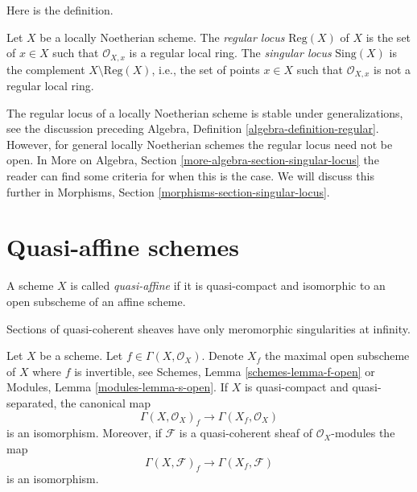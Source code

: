 \noindent
Here is the definition.

\begin{definition}
\label{definition-singular-locus}
Let $X$ be a locally Noetherian scheme. The {\it regular locus}
$\text{Reg}(X)$ of $X$ is the set of $x \in X$ such that $\mathcal{O}_{X, x}$
is a regular local ring. The {\it singular locus} $\text{Sing}(X)$ is the
complement $X \setminus \text{Reg}(X)$, i.e., the set of points $x \in X$
such that $\mathcal{O}_{X, x}$ is not a regular local ring.
\end{definition}

\noindent
The regular locus of a locally Noetherian scheme is stable under
generalizations, see the discussion preceding
Algebra, Definition \ref{algebra-definition-regular}.
However, for general locally Noetherian schemes the regular locus
need not be open. In
More on Algebra, Section \ref{more-algebra-section-singular-locus}
the reader can find some criteria for when this is the case.
We will discuss this further in
Morphisms, Section \ref{morphisms-section-singular-locus}.








\section{Quasi-affine schemes}
\label{section-quasi-affine}

\begin{definition}
\label{definition-quasi-affine}
A scheme $X$ is called {\it quasi-affine} if it is quasi-compact
and isomorphic to an open subscheme of an affine scheme.
\end{definition}

\begin{lemma}
\label{lemma-invert-f-sections}
\begin{slogan}
Sections of quasi-coherent sheaves have only meromorphic singularities
at infinity.
\end{slogan}
Let $X$ be a scheme. Let $f \in \Gamma(X, \mathcal{O}_X)$.
Denote $X_f$ the maximal open subscheme of $X$ where $f$ is invertible, see
Schemes, Lemma \ref{schemes-lemma-f-open} or
Modules, Lemma \ref{modules-lemma-s-open}.
If $X$ is quasi-compact and quasi-separated, the canonical map
$$
\Gamma(X, \mathcal{O}_X)_f \longrightarrow \Gamma(X_f, \mathcal{O}_X)
$$
is an isomorphism. Moreover, if $\mathcal{F}$ is a quasi-coherent
sheaf of $\mathcal{O}_X$-modules the map
$$
\Gamma(X, \mathcal{F})_f \longrightarrow \Gamma(X_f, \mathcal{F})
$$
is an isomorphism.
\end{lemma}

